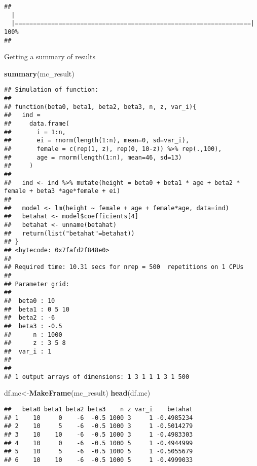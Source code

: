 \documentclass[]{article}
\newenvironment{Shaded}{\begin{snugshade}}{\end{snugshade}}
\newcommand{\KeywordTok}[1]{\textcolor[rgb]{0.13,0.29,0.53}{\textbf{#1}}}
\newcommand{\NormalTok}[1]{#1}
\begin{document}
\begin{verbatim}
## 
  |                                                                       
  |=================================================================| 100%
## 
\end{verbatim}

Getting a summary of results

\begin{Shaded}
\begin{Highlighting}[]
\KeywordTok{summary}\NormalTok{(mc_result)}
\end{Highlighting}
\end{Shaded}

\begin{verbatim}
## Simulation of function: 
## 
## function(beta0, beta1, beta2, beta3, n, z, var_i){
##   ind = 
##     data.frame(
##       i = 1:n,
##       ei = rnorm(length(1:n), mean=0, sd=var_i),
##       female = c(rep(1, z), rep(0, 10-z)) %>% rep(.,100),
##       age = rnorm(length(1:n), mean=46, sd=13)
##     )
##   
##   ind <- ind %>% mutate(height = beta0 + beta1 * age + beta2 * female + beta3 *age*female + ei)
##   
##   model <- lm(height ~ female + age + female*age, data=ind)
##   betahat <- model$coefficients[4]
##   betahat <- unname(betahat)
##   return(list("betahat"=betahat))
## }
## <bytecode: 0x7fafd2f848e0>
## 
## Required time: 10.31 secs for nrep = 500  repetitions on 1 CPUs 
## 
## Parameter grid: 
## 
##  beta0 : 10 
##  beta1 : 0 5 10 
##  beta2 : -6 
##  beta3 : -0.5 
##      n : 1000 
##      z : 3 5 8 
##  var_i : 1 
## 
##  
## 1 output arrays of dimensions: 1 3 1 1 1 3 1 500
\end{verbatim}

\begin{Shaded}
\begin{Highlighting}[]
\NormalTok{  df.mc<-}\KeywordTok{MakeFrame}\NormalTok{(mc_result)}
  \KeywordTok{head}\NormalTok{(df.mc)}
\end{Highlighting}
\end{Shaded}

\begin{verbatim}
##   beta0 beta1 beta2 beta3    n z var_i    betahat
## 1    10     0    -6  -0.5 1000 3     1 -0.4985234
## 2    10     5    -6  -0.5 1000 3     1 -0.5014279
## 3    10    10    -6  -0.5 1000 3     1 -0.4983303
## 4    10     0    -6  -0.5 1000 5     1 -0.4944999
## 5    10     5    -6  -0.5 1000 5     1 -0.5055679
## 6    10    10    -6  -0.5 1000 5     1 -0.4999033
\end{verbatim}
\end{document}
